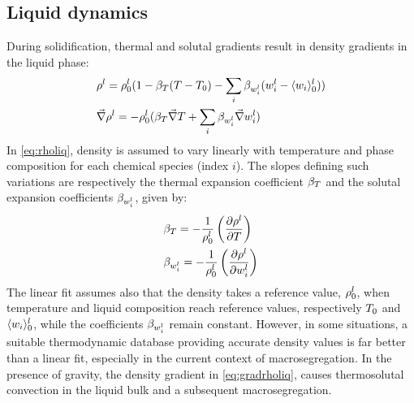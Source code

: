 \subsection{Liquid dynamics}
During solidification, thermal and solutal gradients result in density gradients in the liquid phase: 
\begin{subequations}
\begin{align}
\label{eq:rholiq}
& \rho^l = \rho_{0}^{l} ( 1 - \beta_T (T - T_{0}) - \sum_{i} \beta_{w_i^l} (w_i^l - \langle w_i \rangle_{0}^l) )  \\ 
\label{eq:gradrholiq}
& \vec{\nabla}\rho^l = -\rho_{0}^{l} (  \beta_T \vec{\nabla} T + \sum_{i} \beta_{w_i^l} \vec{\nabla}w_i^l  )
\end{align}
\end{subequations}
%
In \cref{eq:rholiq}, density is assumed to vary linearly with temperature and phase composition 
for each chemical species (index $i$). The slopes defining such variations are respectively the 
thermal expansion coefficient $\beta_T$ and the solutal expansion coefficients $\beta_{w_i^l}$, given by:
%
\begin{subequations}
\begin{align}
\label{eq:betaT}
& \beta_T =  -\frac{1}{\rho_{0}^{l}} \left( \frac{\partial\rho^l}{\partial T} \right)  \\ 
\label{eq:betawil}
& \beta_{w_i^l} = -\frac{1}{\rho_{0}^{l}} \left( \frac{\partial \rho^l}{\partial w_i^l} \right)  
\end{align}
\end{subequations}
%
The linear fit assumes also that the density takes a reference value, $\rho_{0}^{l}$, when temperature 
and liquid composition reach reference values, respectively $T_{0}$ and $\langle w_i \rangle_{0}^l$, while the
coefficients $\beta_{w_i^l}$ remain constant. However, in some 
situations, a suitable thermodynamic database providing accurate density values is far better than a 
linear fit, especially in the current context of macrosegregation. 
In the presence of gravity, the density gradient in \cref{eq:gradrholiq}, causes thermosolutal convection 
in the liquid bulk and a subsequent macrosegregation.
%
% 
